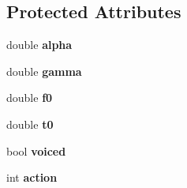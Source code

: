 \subsection*{Protected Attributes}
\begin{DoxyCompactItemize}
\item 
\hypertarget{class_m_a_g_e_1_1_vocoder_a407749e074c4e722099af615da63684f}{double {\bfseries alpha}}\label{class_m_a_g_e_1_1_vocoder_a407749e074c4e722099af615da63684f}

\item 
\hypertarget{class_m_a_g_e_1_1_vocoder_a8fdaf7429b1457c2ec70cbc4080ca7a9}{double {\bfseries gamma}}\label{class_m_a_g_e_1_1_vocoder_a8fdaf7429b1457c2ec70cbc4080ca7a9}

\item 
\hypertarget{class_m_a_g_e_1_1_vocoder_a9433e206e040793167b2bb12dff07430}{double {\bfseries f0}}\label{class_m_a_g_e_1_1_vocoder_a9433e206e040793167b2bb12dff07430}

\item 
\hypertarget{class_m_a_g_e_1_1_vocoder_a2989b96b629bc07f2a1b09f01b6fa1fd}{double {\bfseries t0}}\label{class_m_a_g_e_1_1_vocoder_a2989b96b629bc07f2a1b09f01b6fa1fd}

\item 
\hypertarget{class_m_a_g_e_1_1_vocoder_a5ad040b2ba593e638a29c015c8a8212a}{bool {\bfseries voiced}}\label{class_m_a_g_e_1_1_vocoder_a5ad040b2ba593e638a29c015c8a8212a}

\item 
\hypertarget{class_m_a_g_e_1_1_vocoder_a5c141fafcec68091378466e7bdc5b1d7}{int {\bfseries action}}\label{class_m_a_g_e_1_1_vocoder_a5c141fafcec68091378466e7bdc5b1d7}

\end{DoxyCompactItemize}


